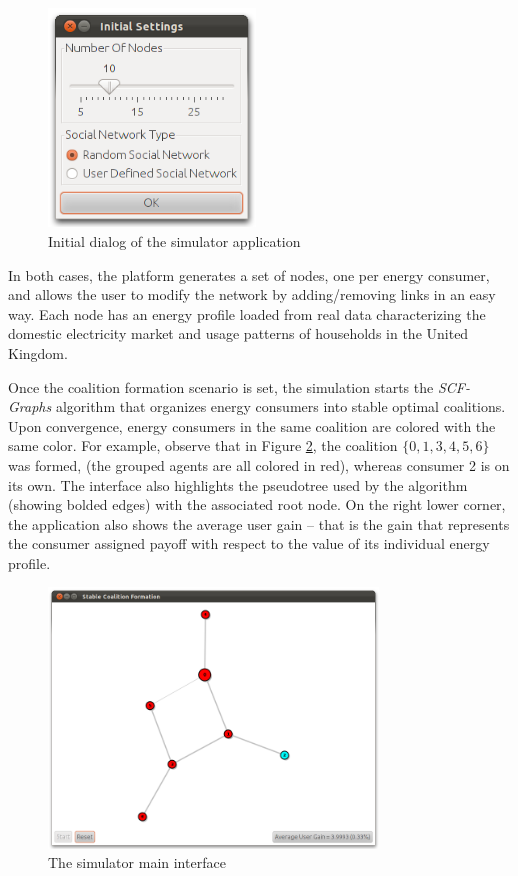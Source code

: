 \documentclass[11pt, twoside, titlepage, a4paper, openright]{report}
\begin{document}
\begin{figure}[!h]
	\centering
	\includegraphics[width=0.49\textwidth]{img/intro.png}
	\caption{\label{fig:intro}Initial dialog of the simulator application}
\end{figure}

\noindent In both cases, the platform generates a set of nodes, one per energy consumer, and allows the user to modify
the network by adding/removing links in an easy way. Each node has an energy profile loaded from real data
characterizing the domestic electricity market and usage patterns of households in the United Kingdom.

Once the coalition formation scenario is set, the simulation starts the \textit{SCF-Graphs} algorithm that organizes energy consumers into stable optimal coalitions. Upon convergence, energy consumers in the same coalition are colored with the same color. For example, observe that in Figure \ref{fig:simulatora}, the coalition $\{0,1,3,4,5,6\}$ was formed, (the grouped agents are all colored in red), whereas consumer 2 is on its own. The interface also highlights the pseudotree used by the algorithm (showing bolded edges) with the associated root node. On the right lower corner, the application also shows the average user gain -- that is the gain that represents the consumer assigned payoff with respect to the value of its individual energy profile.

\begin{figure}[!h]
	\centering
	\includegraphics[width=0.78\textwidth]{img/network_coalitions.png}
	\caption{\label{fig:simulatora}The simulator main interface}
\end{figure}
\end{document}
